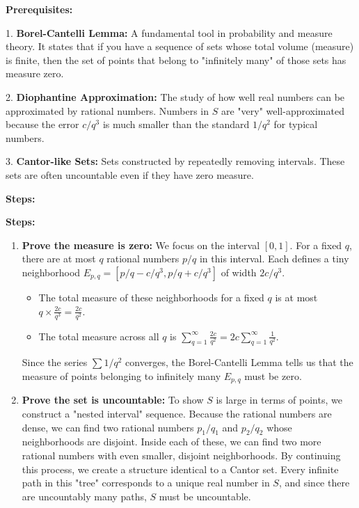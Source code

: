 \begin{solution}
\textbf{Prerequisites:}

1. \textbf{Borel-Cantelli Lemma:} A fundamental tool in probability and measure theory. It states that if you have a sequence of sets whose total volume (measure) is finite, then the set of points that belong to "infinitely many" of those sets has measure zero.

2. \textbf{Diophantine Approximation:} The study of how well real numbers can be approximated by rational numbers. Numbers in $S$ are "very" well-approximated because the error $c/q^3$ is much smaller than the standard $1/q^2$ for typical numbers.

3. \textbf{Cantor-like Sets:} Sets constructed by repeatedly removing intervals. These sets are often uncountable even if they have zero measure.


\textbf{Steps:}

\textbf{Steps:}
\begin{enumerate}
    \item \textbf{Prove the measure is zero:}
        We focus on the interval $[0, 1]$. For a fixed $q$, there are at most $q$ rational numbers $p/q$ in this interval. Each defines a tiny neighborhood $E_{p,q} = [p/q - c/q^3, p/q + c/q^3]$ of width $2c/q^3$.
        \begin{itemize}
            \item The total measure of these neighborhoods for a fixed $q$ is at most $q \times \frac{2c}{q^3} = \frac{2c}{q^2}$.
            \item The total measure across all $q$ is $\sum_{q=1}^\infty \frac{2c}{q^2} = 2c \sum_{q=1}^\infty \frac{1}{q^2}$.
        \end{itemize}
        Since the series $\sum 1/q^2$ converges, the Borel-Cantelli Lemma tells us that the measure of points belonging to infinitely many $E_{p,q}$ must be zero.

    \item \textbf{Prove the set is uncountable:}
        To show $S$ is large in terms of points, we construct a "nested interval" sequence. Because the rational numbers are dense, we can find two rational numbers $p_1/q_1$ and $p_2/q_2$ whose neighborhoods are disjoint. Inside each of these, we can find two more rational numbers with even smaller, disjoint neighborhoods.
        By continuing this process, we create a structure identical to a Cantor set. Every infinite path in this "tree" corresponds to a unique real number in $S$, and since there are uncountably many paths, $S$ must be uncountable.
\end{enumerate}



\end{solution}
